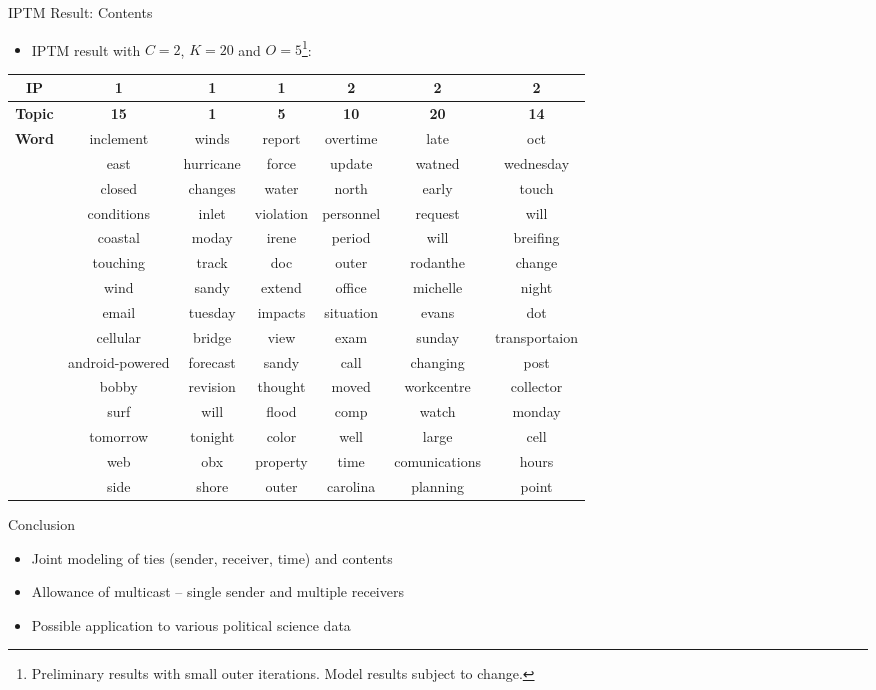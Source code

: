 \documentclass[10pt]{beamer}
\def\bni{\begin{itemize}} \def\ei{\end{itemize}}
\theoremstyle{definition}
\theoremstyle{remark}
\begin{document}
 \begin{frame}{IPTM Result: Contents}
 	\bni \item IPTM result with $C=2$, $K=20$ and $O= 5$\footnote{Preliminary results with small outer iterations. Model results subject to change.}:
 	\ei
 	\scriptsize
\centering	\begin{table}[ht]
	\centering
	\begin{tabular}{ |c||c|c|c||c|c|c|} 
		\hline
		\textbf{IP} & \textbf{1} &  \textbf{1} & \textbf{1}  &\textbf{2} &\textbf{2}  &\textbf{2}  \\ \hline\hline
			\textbf{Topic} & \textbf{15} &  \textbf{1} & \textbf{5}  &\textbf{10} &\textbf{20}  &\textbf{14}  \\ \hline\hline
			\textbf{Word}& inclement & winds& report& overtime & late & oct\\
			& east & hurricane & force & update & watned & wednesday \\
			& closed & changes & water & north & early & touch \\
			& conditions & inlet &  violation & personnel & request & will \\
			& coastal &moday & irene& period & will & breifing \\
			& touching &track & doc& outer & rodanthe & change \\
			& wind & sandy & extend& office & michelle & night \\
			& email & tuesday & impacts & situation & evans & dot \\
			& cellular & bridge & view & exam & sunday & transportaion\\
			& android-powered & forecast &  sandy & call & changing & post \\
			& bobby & revision &  thought & moved & workcentre &  collector\\
			& surf & will &  flood & comp & watch & monday\\
			& tomorrow & tonight & color & well & large & cell\\
			& web & obx & property & time & comunications & hours\\
			& side & shore &  outer & carolina & planning &  point\\
			
				\hline
	\end{tabular}
\end{table}
\normalsize
\end{frame}

\begin{frame}{Conclusion}
 \bni
 \item Joint modeling of ties (sender, receiver, time) and contents
 	\vspace{0.4cm}
 \item Allowance of multicast -- single sender and multiple receivers
 	\vspace{0.4cm}
 \item Possible application to various political science data
 \ei
\end{frame}
\end{document}
